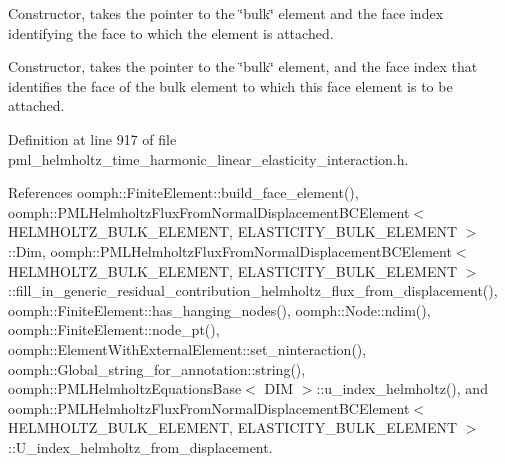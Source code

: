 Constructor, takes the pointer to the \char`\"{}bulk\char`\"{} element and the face index identifying the face to which the element is attached. 

Constructor, takes the pointer to the \char`\"{}bulk\char`\"{} element, and the face index that identifies the face of the bulk element to which this face element is to be attached. 

Definition at line 917 of file pml\+\_\+helmholtz\+\_\+time\+\_\+harmonic\+\_\+linear\+\_\+elasticity\+\_\+interaction.\+h.



References oomph\+::\+Finite\+Element\+::build\+\_\+face\+\_\+element(), oomph\+::\+P\+M\+L\+Helmholtz\+Flux\+From\+Normal\+Displacement\+B\+C\+Element$<$ H\+E\+L\+M\+H\+O\+L\+T\+Z\+\_\+\+B\+U\+L\+K\+\_\+\+E\+L\+E\+M\+E\+N\+T, E\+L\+A\+S\+T\+I\+C\+I\+T\+Y\+\_\+\+B\+U\+L\+K\+\_\+\+E\+L\+E\+M\+E\+N\+T $>$\+::\+Dim, oomph\+::\+P\+M\+L\+Helmholtz\+Flux\+From\+Normal\+Displacement\+B\+C\+Element$<$ H\+E\+L\+M\+H\+O\+L\+T\+Z\+\_\+\+B\+U\+L\+K\+\_\+\+E\+L\+E\+M\+E\+N\+T, E\+L\+A\+S\+T\+I\+C\+I\+T\+Y\+\_\+\+B\+U\+L\+K\+\_\+\+E\+L\+E\+M\+E\+N\+T $>$\+::fill\+\_\+in\+\_\+generic\+\_\+residual\+\_\+contribution\+\_\+helmholtz\+\_\+flux\+\_\+from\+\_\+displacement(), oomph\+::\+Finite\+Element\+::has\+\_\+hanging\+\_\+nodes(), oomph\+::\+Node\+::ndim(), oomph\+::\+Finite\+Element\+::node\+\_\+pt(), oomph\+::\+Element\+With\+External\+Element\+::set\+\_\+ninteraction(), oomph\+::\+Global\+\_\+string\+\_\+for\+\_\+annotation\+::string(), oomph\+::\+P\+M\+L\+Helmholtz\+Equations\+Base$<$ D\+I\+M $>$\+::u\+\_\+index\+\_\+helmholtz(), and oomph\+::\+P\+M\+L\+Helmholtz\+Flux\+From\+Normal\+Displacement\+B\+C\+Element$<$ H\+E\+L\+M\+H\+O\+L\+T\+Z\+\_\+\+B\+U\+L\+K\+\_\+\+E\+L\+E\+M\+E\+N\+T, E\+L\+A\+S\+T\+I\+C\+I\+T\+Y\+\_\+\+B\+U\+L\+K\+\_\+\+E\+L\+E\+M\+E\+N\+T $>$\+::\+U\+\_\+index\+\_\+helmholtz\+\_\+from\+\_\+displacement.

\mbox{\label{classoomph_1_1PMLHelmholtzFluxFromNormalDisplacementBCElement_a4eaae55dc9bd4d6076cf9f6f75f06df3}} 

